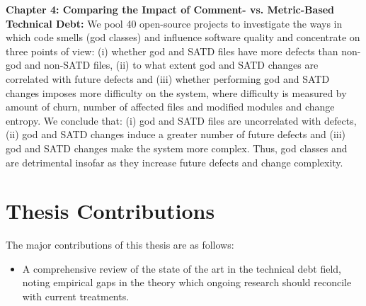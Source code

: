 \textbf{Chapter 4: Comparing the Impact of Comment- vs. Metric-Based Technical Debt:} We pool 40 open-source projects to investigate the ways in which code smells (god classes) and \SATD influence software quality and concentrate on three points of view: (i) whether god and SATD files have more defects than non-god and non-SATD files, (ii) to what extent god and SATD changes are correlated with future defects and (iii) whether performing god and SATD changes imposes more difficulty on the system, where difficulty is measured by amount of churn, number of affected files and modified modules and change entropy. We conclude that: (i) god and SATD files are uncorrelated with defects, (ii) god and SATD changes induce a greater number of future defects and (iii) god and SATD changes make the system more complex. Thus, god classes and \SATD are detrimental insofar as they increase future defects and change complexity.

\section{Thesis Contributions}
The major contributions of this thesis are as follows:
\begin{itemize}
	\item A comprehensive review of the state of the art in the technical debt field, noting empirical gaps in the theory which ongoing research should reconcile with current treatments.
	
\end{itemize}